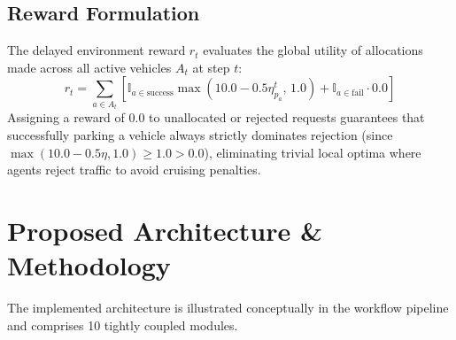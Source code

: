 \documentclass[journal]{IEEEtran}
\begin{document}
\subsection{Reward Formulation}
The delayed environment reward $r_t$ evaluates the global utility of allocations made across all active vehicles $A_t$ at step $t$:
\begin{equation}
r_t = \sum_{a \in A_t} \left[ \mathbb{I}_{a \in \text{success}} \max(10.0 - 0.5 \eta_{p_a}^t, \, 1.0) + \mathbb{I}_{a \in \text{fail}} \cdot 0.0 \right]
\label{eq:reward}
\end{equation}
Assigning a reward of $0.0$ to unallocated or rejected requests guarantees that successfully parking a vehicle always strictly dominates rejection (since $\max(10.0 - 0.5 \eta, 1.0) \ge 1.0 > 0.0$), eliminating trivial local optima where agents reject traffic to avoid cruising penalties.

\section{Proposed Architecture \& Methodology}
\label{sec:methodology}

The implemented architecture is illustrated conceptually in the workflow pipeline and comprises 10 tightly coupled modules.

\end{document}
